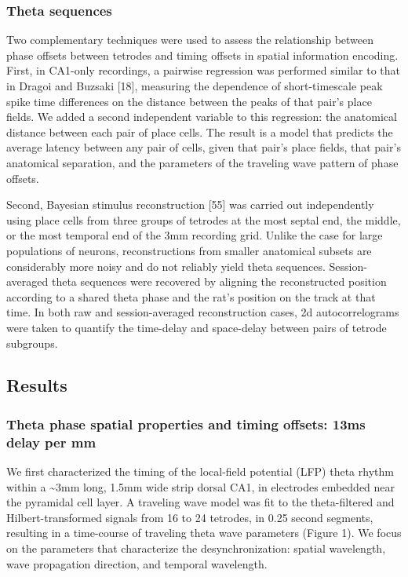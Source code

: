 \documentclass[]{article}
\begin{document}
\subsubsection{Theta sequences}

Two complementary techniques were used to assess the relationship
between phase offsets between tetrodes and timing offsets in spatial
information encoding. First, in CA1-only recordings, a pairwise
regression was performed similar to that in Dragoi and Buzsaki {[}18{]},
measuring the dependence of short-timescale peak spike time differences
on the distance between the peaks of that pair's place fields. We added
a second independent variable to this regression: the anatomical
distance between each pair of place cells. The result is a model that
predicts the average latency between any pair of cells, given that
pair's place fields, that pair's anatomical separation, and the
parameters of the traveling wave pattern of phase offsets.

Second, Bayesian stimulus reconstruction {[}55{]} was carried out
independently using place cells from three groups of tetrodes at the
most septal end, the middle, or the most temporal end of the 3mm
recording grid. Unlike the case for large populations of neurons,
reconstructions from smaller anatomical subsets are considerably more
noisy and do not reliably yield theta sequences. Session-averaged theta
sequences were recovered by aligning the reconstructed position
according to a shared theta phase and the rat's position on the track at
that time. In both raw and session-averaged reconstruction cases, 2d
autocorrelograms were taken to quantify the time-delay and space-delay
between pairs of tetrode subgroups.

\subsection{Results}

\subsubsection{Theta phase spatial properties and timing offsets: 13ms
delay per mm}

We first characterized the timing of the local-field potential (LFP)
theta rhythm within a \textasciitilde{}3mm long, 1.5mm wide strip dorsal
CA1, in electrodes embedded near the pyramidal cell layer. A traveling
wave model was fit to the theta-filtered and Hilbert-transformed signals
from 16 to 24 tetrodes, in 0.25 second segments, resulting in a
time-course of traveling theta wave parameters (Figure 1). We focus on
the parameters that characterize the desynchronization: spatial
wavelength, wave propagation direction, and temporal wavelength.
\end{document}
